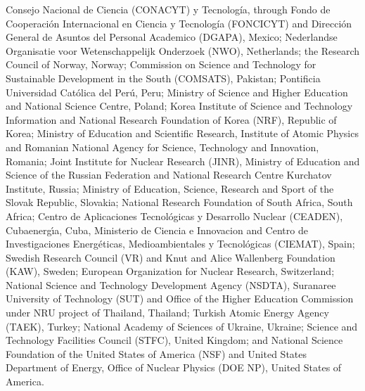 %
Consejo Nacional de Ciencia (CONACYT) y Tecnolog\'{i}a, through Fondo de Cooperaci\'{o}n Internacional en Ciencia y Tecnolog\'{i}a (FONCICYT) and Direcci\'{o}n General de Asuntos del Personal Academico (DGAPA), Mexico;
%
Nederlandse Organisatie voor Wetenschappelijk Onderzoek (NWO), Netherlands;
%
the Research Council of Norway, Norway;
%
Commission on Science and Technology for Sustainable Development in the South (COMSATS), Pakistan;
%
Pontificia Universidad Cat\'{o}lica del Per\'{u}, Peru;
%
Ministry of Science and Higher Education and National Science Centre, Poland;
%
Korea Institute of Science and Technology Information and National Research Foundation of Korea (NRF), Republic of Korea;
%
Ministry of Education and Scientific Research, Institute of Atomic Physics and Romanian National Agency for Science, Technology and Innovation, Romania;
%
Joint Institute for Nuclear Research (JINR), Ministry of Education and Science of the Russian Federation and National Research Centre Kurchatov Institute, Russia;
%
Ministry of Education, Science, Research and Sport of the Slovak Republic, Slovakia;
%
National Research Foundation of South Africa, South Africa;
%
Centro de Aplicaciones Tecnol\'{o}gicas y Desarrollo Nuclear (CEADEN), Cubaenerg\'{\i}a, Cuba, Ministerio de Ciencia e Innovacion and Centro de Investigaciones Energ\'{e}ticas, Medioambientales y Tecnol\'{o}gicas (CIEMAT), Spain;
%
Swedish Research Council (VR) and Knut and Alice Wallenberg Foundation (KAW), Sweden;
%
European Organization for Nuclear Research, Switzerland;
%
National Science and Technology Development Agency (NSDTA), Suranaree University of Technology (SUT) and Office of the Higher Education Commission under NRU project of Thailand, Thailand;
%
Turkish Atomic Energy Agency (TAEK), Turkey;
%
National Academy of  Sciences of Ukraine, Ukraine;
%
Science and Technology Facilities Council (STFC), United Kingdom;
%
and National Science Foundation of the United States of America (NSF) and United States Department of Energy, Office of Nuclear Physics (DOE NP), United States of America.